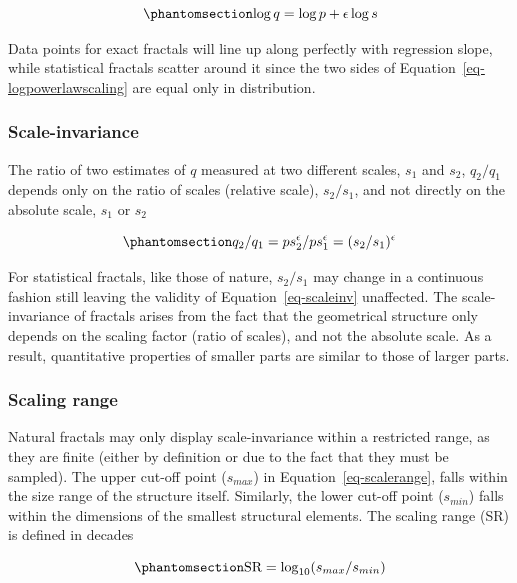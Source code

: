 \documentclass[
  sn-vancouver,
  Numbered,
  referee,
  lineno]{sn-jnl}
\begin{document}
\begin{equation}\phantomsection\label{eq-logpowerlawscaling}{
\log{q} = \log{p} + \epsilon\log{s}
}\end{equation}

Data points for exact fractals will line up along perfectly with
regression slope, while statistical fractals scatter around it since the
two sides of Equation~\ref{eq-logpowerlawscaling} are equal only in
distribution.

\subsubsection{Scale-invariance}\label{scale-invariance}

The ratio of two estimates of \(q\) measured at two different scales,
\(s_{1}\) and \(s_{2}\), \(q_{2}/q_{1}\) depends only on the ratio of
scales (relative scale), \(s_{2}/s_{1}\), and not directly on the
absolute scale, \(s_{1}\) or \(s_{2}\)

\begin{equation}\phantomsection\label{eq-scaleinv}{
q_{2}/q_{1} = ps_2^\epsilon / ps_1^\epsilon = (s_2 / s_1)^\epsilon
}\end{equation}

For statistical fractals, like those of nature, \(s_2/s_1\) may change
in a continuous fashion still leaving the validity of
Equation~\ref{eq-scaleinv} unaffected. The scale-invariance of fractals
arises from the fact that the geometrical structure only depends on the
scaling factor (ratio of scales), and not the absolute scale. As a
result, quantitative properties of smaller parts are similar to those of
larger parts.

\subsubsection{Scaling range}\label{scaling-range}

Natural fractals may only display scale-invariance within a restricted
range, as they are finite (either by definition or due to the fact that
they must be sampled). The upper cut-off point (\(s_{max}\)) in
Equation~\ref{eq-scalerange}, falls within the size range of the
structure itself. Similarly, the lower cut-off point (\(s_{min}\)) falls
within the dimensions of the smallest structural elements. The scaling
range (SR) is defined in decades

\begin{equation}\phantomsection\label{eq-scalerange}{
\text{SR} = \log_{10}(s_{max}/s_{min})
}\end{equation}
\end{document}
